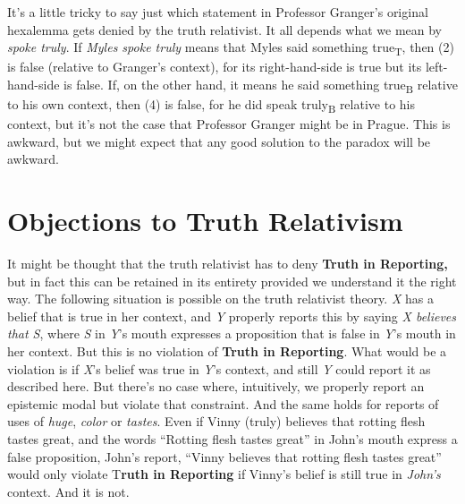 It's a little tricky to say just which statement in Professor Granger's original hexalemma gets denied by the truth relativist. It all depends what we mean by \textit{spoke truly}. If \textit{Myles spoke truly} means that Myles said something true\textsubscript{T}, then (2) is false (relative to Granger's context), for its right-hand-side is true but its left-hand-side is false. If, on the other hand, it means he said something true\textsubscript{B} relative to his own context, then (4) is false, for he did speak truly\textsubscript{B} relative to his context, but it's not the case that Professor Granger might be in Prague. This is awkward, but we might expect that any good solution to the paradox will be awkward.
 
 
\section{Objections to Truth Relativism} 
 
It might be thought that the truth relativist has to deny \textbf{Truth in Reporting, }but in fact this can be retained in its entirety provided we understand it the right way. The following situation is possible on the truth relativist theory. \textit{X} has a belief that is true in her context, and \textit{Y} properly reports this by saying \textit{X believes that S}, where \textit{S} in \textit{Y}'s mouth expresses a proposition that is false in \textit{Y}'s mouth in her context. But this is no violation of \textbf{Truth in Reporting}. What would be a violation is if \textit{X}'s belief was true in \textit{Y}'s context, and still \textit{Y} could report it as described here. But there's no case where, intuitively, we properly report an epistemic modal but violate that constraint. And the same holds for reports of uses of \textit{huge}, \textit{color} or \textit{tastes}. Even if Vinny (truly) believes that rotting flesh tastes great, and the words ``Rotting flesh tastes great'' in John's mouth express a false proposition, John's report, ``Vinny believes that rotting flesh tastes great'' would only violate T\textbf{ruth in Reporting} if Vinny's belief is still true in \textit{John's} context. And it is not. 
 

